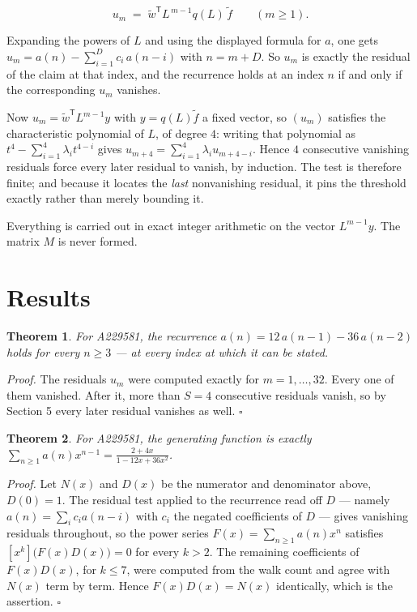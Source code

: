 \documentclass[11pt]{article}
\newtheorem{theorem}{Theorem}
\theoremstyle{definition}
\begin{document}
\[u_m \;=\; \tilde w^{\mathsf T} L^{\,m-1} q(L)\,\tilde f \qquad (m \ge 1).\]

Expanding the powers of $L$ and using the displayed formula for $a$, one gets $u_m = a(n) - \sum_{i=1}^{D} c_i\,a(n-i)$ with $n = m + D$. So $u_m$ is exactly the residual of the claim at that index, and the recurrence holds at an index $n$ if and only if the corresponding $u_m$ vanishes.

Now $u_m = \tilde w^{\mathsf T} L^{m-1} y$ with $y = q(L)\tilde f$ a fixed vector, so $(u_m)$ satisfies the characteristic polynomial of $L$, of degree $4$: writing that polynomial as $t^{4} - \sum_{i=1}^{4} \lambda_i t^{4-i}$ gives $u_{m+4} = \sum_{i=1}^{4} \lambda_i u_{m+4-i}$. Hence $4$ consecutive vanishing residuals force every later residual to vanish, by induction. The test is therefore finite; and because it locates the {\itshape last} nonvanishing residual, it pins the threshold exactly rather than merely bounding it.

Everything is carried out in exact integer arithmetic on the vector $L^{m-1}y$. The matrix $M$ is never formed.

\section{Results}

\begin{theorem} For A229581, the recurrence $a(n) = 12\,a(n-1) - 36\,a(n-2)$ holds for every $n \ge 3$ --- at every index at which it can be stated.\end{theorem}

{\itshape Proof.} The residuals $u_m$ were computed exactly for $m = 1,\dots,32$. Every one of them vanished. After it, more than $S = 4$ consecutive residuals vanish, so by Section 5 every later residual vanishes as well. $\square$

\begin{theorem} For A229581, the generating function is exactly $\sum_{n\ge 1} a(n)x^{n-1} = \frac{2 + 4x}{1 - 12x + 36x^{2}}$.\end{theorem}

{\itshape Proof.} Let $N(x)$ and $D(x)$ be the numerator and denominator above, $D(0)=1$. The residual test applied to the recurrence read off $D$ --- namely $a(n) = \sum_i c_i a(n-i)$ with $c_i$ the negated coefficients of $D$ --- gives vanishing residuals throughout, so the power series $F(x)=\sum_{n\ge 1}a(n)x^n$ satisfies $[x^k]\bigl(F(x)D(x)\bigr) = 0$ for every $k > 2$. The remaining coefficients of $F(x)D(x)$, for $k \le 7$, were computed from the walk count and agree with $N(x)$ term by term. Hence $F(x)D(x) = N(x)$ identically, which is the assertion. $\square$
\end{document}
